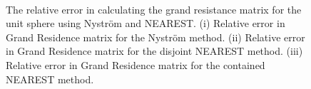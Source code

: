 \begin{figure}[ht!]
 \centering
 \\
 \caption[The relative error in calculating the grand resistance matrix for the unit sphere using Nyström and NEAREST.]{The relative error in calculating the grand resistance matrix for the unit sphere using Nyström and NEAREST. (i) Relative error in Grand Residence matrix for the Nyström method. (ii) Relative error in Grand Residence matrix for the disjoint NEAREST method. (iii) Relative error in Grand Residence matrix for the contained NEAREST method.}
 \label{fig:NEARESTCOMP}
\end{figure}


